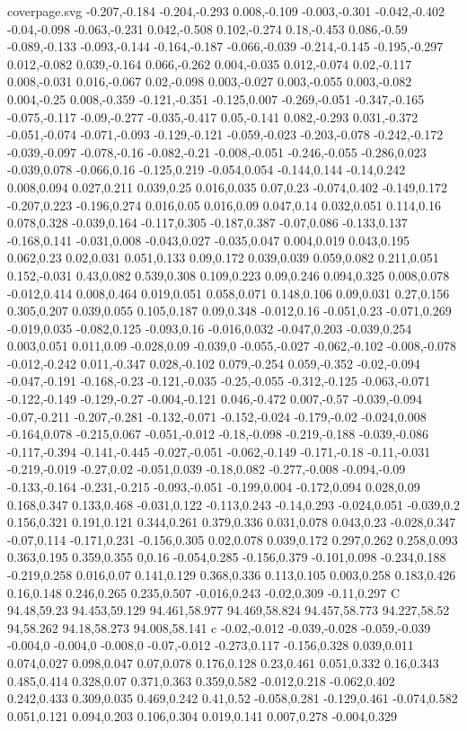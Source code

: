 \begin{filecontents}[noheader]{coverpage.svg}
-0.207,-0.184 -0.204,-0.293 0.008,-0.109 -0.003,-0.301 -0.042,-0.402 -0.04,-0.098 -0.063,-0.231 0.042,-0.508 0.102,-0.274 0.18,-0.453 0.086,-0.59 -0.089,-0.133 -0.093,-0.144 -0.164,-0.187 -0.066,-0.039 -0.214,-0.145 -0.195,-0.297 0.012,-0.082 0.039,-0.164 0.066,-0.262 0.004,-0.035 0.012,-0.074 0.02,-0.117 0.008,-0.031 0.016,-0.067 0.02,-0.098 0.003,-0.027 0.003,-0.055 0.003,-0.082 0.004,-0.25 0.008,-0.359 -0.121,-0.351 -0.125,0.007 -0.269,-0.051 -0.347,-0.165 -0.075,-0.117 -0.09,-0.277 -0.035,-0.417 0.05,-0.141 0.082,-0.293 0.031,-0.372 -0.051,-0.074 -0.071,-0.093 -0.129,-0.121 -0.059,-0.023 -0.203,-0.078 -0.242,-0.172 -0.039,-0.097 -0.078,-0.16 -0.082,-0.21 -0.008,-0.051 -0.246,-0.055 -0.286,0.023 -0.039,0.078 -0.066,0.16 -0.125,0.219 -0.054,0.054 -0.144,0.144 -0.14,0.242 0.008,0.094 0.027,0.211 0.039,0.25 0.016,0.035 0.07,0.23 -0.074,0.402 -0.149,0.172 -0.207,0.223 -0.196,0.274 0.016,0.05 0.016,0.09 0.047,0.14 0.032,0.051 0.114,0.16 0.078,0.328 -0.039,0.164 -0.117,0.305 -0.187,0.387 -0.07,0.086 -0.133,0.137 -0.168,0.141 -0.031,0.008 -0.043,0.027 -0.035,0.047 0.004,0.019 0.043,0.195 0.062,0.23 0.02,0.031 0.051,0.133 0.09,0.172 0.039,0.039 0.059,0.082 0.211,0.051 0.152,-0.031 0.43,0.082 0.539,0.308 0.109,0.223 0.09,0.246 0.094,0.325 0.008,0.078 -0.012,0.414 0.008,0.464 0.019,0.051 0.058,0.071 0.148,0.106 0.09,0.031 0.27,0.156 0.305,0.207 0.039,0.055 0.105,0.187 0.09,0.348 -0.012,0.16 -0.051,0.23 -0.071,0.269 -0.019,0.035 -0.082,0.125 -0.093,0.16 -0.016,0.032 -0.047,0.203 -0.039,0.254 0.003,0.051 0.011,0.09 -0.028,0.09 -0.039,0 -0.055,-0.027 -0.062,-0.102 -0.008,-0.078 -0.012,-0.242 0.011,-0.347 0.028,-0.102 0.079,-0.254 0.059,-0.352 -0.02,-0.094 -0.047,-0.191 -0.168,-0.23 -0.121,-0.035 -0.25,-0.055 -0.312,-0.125 -0.063,-0.071 -0.122,-0.149 -0.129,-0.27 -0.004,-0.121 0.046,-0.472 0.007,-0.57 -0.039,-0.094 -0.07,-0.211 -0.207,-0.281 -0.132,-0.071 -0.152,-0.024 -0.179,-0.02 -0.024,0.008 -0.164,0.078 -0.215,0.067 -0.051,-0.012 -0.18,-0.098 -0.219,-0.188 -0.039,-0.086 -0.117,-0.394 -0.141,-0.445 -0.027,-0.051 -0.062,-0.149 -0.171,-0.18 -0.11,-0.031 -0.219,-0.019 -0.27,0.02 -0.051,0.039 -0.18,0.082 -0.277,-0.008 -0.094,-0.09 -0.133,-0.164 -0.231,-0.215 -0.093,-0.051 -0.199,0.004 -0.172,0.094 0.028,0.09 0.168,0.347 0.133,0.468 -0.031,0.122 -0.113,0.243 -0.14,0.293 -0.024,0.051 -0.039,0.2 0.156,0.321 0.191,0.121 0.344,0.261 0.379,0.336 0.031,0.078 0.043,0.23 -0.028,0.347 -0.07,0.114 -0.171,0.231 -0.156,0.305 0.02,0.078 0.039,0.172 0.297,0.262 0.258,0.093 0.363,0.195 0.359,0.355 0,0.16 -0.054,0.285 -0.156,0.379 -0.101,0.098 -0.234,0.188 -0.219,0.258 0.016,0.07 0.141,0.129 0.368,0.336 0.113,0.105 0.003,0.258 0.183,0.426 0.16,0.148 0.246,0.265 0.235,0.507 -0.016,0.243 -0.02,0.309 -0.11,0.297 C 94.48,59.23 94.453,59.129 94.461,58.977 94.469,58.824 94.457,58.773 94.227,58.52 94,58.262 94.18,58.273 94.008,58.141 c -0.02,-0.012 -0.039,-0.028 -0.059,-0.039 -0.004,0 -0.004,0 -0.008,0 -0.07,-0.012 -0.273,0.117 -0.156,0.328 0.039,0.011 0.074,0.027 0.098,0.047 0.07,0.078 0.176,0.128 0.23,0.461 0.051,0.332 0.16,0.343 0.485,0.414 0.328,0.07 0.371,0.363 0.359,0.582 -0.012,0.218 -0.062,0.402 0.242,0.433 0.309,0.035 0.469,0.242 0.41,0.52 -0.058,0.281 -0.129,0.461 -0.074,0.582 0.051,0.121 0.094,0.203 0.106,0.304 0.019,0.141 0.007,0.278 -0.004,0.329 
\end{filecontents}
